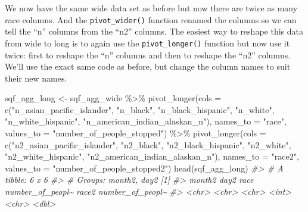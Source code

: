 \documentclass[
]{krantz}
\makeatletter
\newenvironment{Shaded}{\begin{snugshade}}{\end{snugshade}}
\newcommand{\AttributeTok}[1]{\textcolor[rgb]{0.61,0.61,0.61}{#1}}
\newcommand{\CommentTok}[1]{\textcolor[rgb]{0.37,0.37,0.37}{\textit{#1}}}
\newcommand{\FunctionTok}[1]{\textcolor[rgb]{0,0,0}{#1}}
\newcommand{\NormalTok}[1]{#1}
\newcommand{\OtherTok}[1]{\textcolor[rgb]{0.37,0.37,0.37}{#1}}
\newcommand{\SpecialCharTok}[1]{\textcolor[rgb]{0,0,0}{#1}}
\newcommand{\StringTok}[1]{\textcolor[rgb]{0.5,0.5,0.5}{#1}}
\newenvironment{kframe}{%
\medskip{}
\setlength{\fboxsep}{.8em}
 \def\at@end@of@kframe{}%
 \ifinner\ifhmode%
  \def\at@end@of@kframe{\end{minipage}}%
  \begin{minipage}{\columnwidth}%
 \fi\fi%
 \def\FrameCommand##1{\hskip\@totalleftmargin \hskip-\fboxsep
 \colorbox{shadecolor}{##1}\hskip-\fboxsep
     \hskip-\linewidth \hskip-\@totalleftmargin \hskip\columnwidth}%
 \MakeFramed {\advance\hsize-\width
   \@totalleftmargin\z@ \linewidth\hsize
   \@setminipage}}%
 {\par\unskip\endMakeFramed%
 \at@end@of@kframe}
\renewenvironment{Shaded}{\begin{kframe}}{\end{kframe}}
\makeatother
\begin{document}
We now have the same wide data set as before but now there are twice as many race columns. And the \texttt{pivot\_wider()} function renamed the columns so we can tell the ``n'' columns from the ``n2'' columns. The easiest way to reshape this data from wide to long is to again use the \texttt{pivot\_longer()} function but now use it twice: first to reshape the ``n'' columns and then to reshape the ``n2'' columns. We'll use the exact same code as before, but change the column names to suit their new names.

\begin{Shaded}
\begin{Highlighting}[]
\NormalTok{sqf\_agg\_long }\OtherTok{\textless{}{-}}\NormalTok{ sqf\_agg\_wide }\SpecialCharTok{\%\textgreater{}\%}
  \FunctionTok{pivot\_longer}\NormalTok{(}\AttributeTok{cols =} \FunctionTok{c}\NormalTok{(}\StringTok{"n\_asian\_pacific\_islander"}\NormalTok{, }
                        \StringTok{"n\_black"}\NormalTok{,}
                        \StringTok{"n\_black\_hispanic"}\NormalTok{,}
                        \StringTok{"n\_white"}\NormalTok{,}
                        \StringTok{"n\_white\_hispanic"}\NormalTok{,}
                        \StringTok{"n\_american\_indian\_alaskan\_n"}\NormalTok{),}
               \AttributeTok{names\_to =} \StringTok{"race"}\NormalTok{,}
               \AttributeTok{values\_to =} \StringTok{"number\_of\_people\_stopped"}\NormalTok{) }\SpecialCharTok{\%\textgreater{}\%}
  \FunctionTok{pivot\_longer}\NormalTok{(}\AttributeTok{cols =} \FunctionTok{c}\NormalTok{(}\StringTok{"n2\_asian\_pacific\_islander"}\NormalTok{, }
                        \StringTok{"n2\_black"}\NormalTok{,}
                        \StringTok{"n2\_black\_hispanic"}\NormalTok{,}
                        \StringTok{"n2\_white"}\NormalTok{,}
                        \StringTok{"n2\_white\_hispanic"}\NormalTok{,}
                        \StringTok{"n2\_american\_indian\_alaskan\_n"}\NormalTok{),}
               \AttributeTok{names\_to =} \StringTok{"race2"}\NormalTok{,}
               \AttributeTok{values\_to =} \StringTok{"number\_of\_people\_stopped2"}\NormalTok{) }
\FunctionTok{head}\NormalTok{(sqf\_agg\_long)}
\CommentTok{\#\textgreater{} \# A tibble: 6 x 6}
\CommentTok{\#\textgreater{} \# Groups:   month2, day2 [1]}
\CommentTok{\#\textgreater{}   month2 day2   race                     number\_of\_peopl\textasciitilde{} race2 number\_of\_peopl\textasciitilde{}}
\CommentTok{\#\textgreater{}   \textless{}chr\textgreater{}  \textless{}chr\textgreater{}  \textless{}chr\textgreater{}                               \textless{}int\textgreater{} \textless{}chr\textgreater{}            \textless{}dbl\textgreater{}}

\end{Highlighting}
\end{Shaded}
\end{document}
